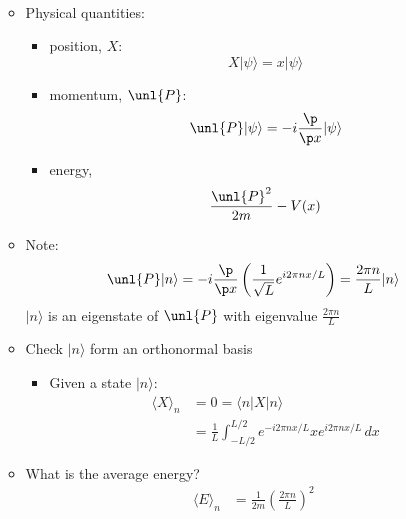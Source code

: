 \documentclass[cplx.tex]{subfiles}
\begin{document}
\begin{itemize}
\begin{itemize}
\begin{align}
                \end{align}
            \item Physical quantities:
                \begin{itemize}
                    \item position, $X$: 
                        \begin{equation}
                            X|\psi\rangle = x|\psi\rangle
                        \end{equation}
                    \item momentum, $\unl{P}$:
                        \begin{equation}
                            \unl{P}|\psi\rangle = -i\frac{\p}{\p x} |\psi\rangle
                        \end{equation}
                    \item energy,
                        \begin{equation}
                            \frac{\unl{P}^2}{2m} - V(x)
                        \end{equation}
                \end{itemize}
            \item Note:
                \begin{align}
                    \unl{P}|n\rangle = -i\frac{\p}{\p x} \left(\frac{1}{\sqrt{L}} e^{i2\pi nx/L}\right) = \frac{2\pi n}{L} |n\rangle
                \end{align}
                $|n\rangle$ is an eigenstate of $\unl{P}$ with eigenvalue $\frac{2\pi n}{L}$
            \item Check $|n\rangle$ form an orthonormal basis
                \begin{itemize}
                    \item Given a state $|n\rangle$:
                        \begin{align}
                            \langle X\rangle_n &= 0 = \langle n|X|n\rangle \\
                                               &= \frac{1}{L} \int_{-L/2}^{L/2} e^{-i2\pi nx/L} xe^{i2\pi nx/L}\,dx
                        \end{align}
                \end{itemize}
            \item What is the average energy? 
                \begin{align}
                    \langle E\rangle_n &= \frac{1}{2m} \left(\frac{2\pi n}{L}\right)^2

\end{align}
\end{itemize}
\end{itemize}
\end{document}

